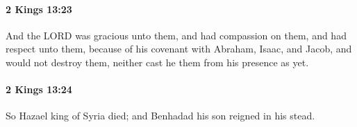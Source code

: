 		\paragraph{2 Kings 13:23} %
			\label{2KINGS-13-23}

			And the LORD was gracious unto them, and had compassion on them, and had respect unto them, because of his covenant with Abraham, Isaac, and Jacob, and would not destroy them, neither cast he them from his presence as yet.


		\paragraph{2 Kings 13:24} %
			\label{2KINGS-13-24}

			So Hazael king of Syria died; and Benhadad his son reigned in his stead.


